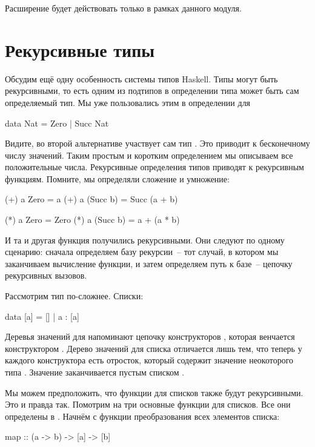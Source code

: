 Расширение будет действовать только в рамках данного модуля.


\section{Рекурсивные типы}

Обсудим ещё одну особенность системы типов Haskell. 
Типы могут быть рекурсивными,
то есть одним из подтипов в определении типа может быть
сам определяемый тип. Мы уже пользовались этим в определении
для 

\begin{code}
data Nat = Zero | Succ Nat
\end{code}

Видите, во второй альтернативе участвует сам тип .
Это приводит к бесконечному числу значений. Таким
простым и коротким определением мы описываем все
положительные числа. Рекурсивные определения типов приводят
к рекурсивным функциям. Помните, мы определяли сложение 
и умножение:

\begin{code}
(+) a Zero     = a
(+) a (Succ b) = Succ (a + b)

(*) a Zero     = Zero
(*) a (Succ b) = a + (a * b)   
\end{code}

И та и другая функция получились рекурсивными.
Они следуют по одному сценарию: сначала определяем базу
рекурсии~-- тот случай, в котором мы заканчиваем 
вычисление функции, и затем определяем путь к базе~--
цепочку рекурсивных вызовов. 

Рассмотрим тип по-сложнее. Списки:

\begin{code}
data [a] = [] | a : [a]
\end{code}

Деревья значений для  напоминают цепочку 
конструкторов , которая венчается конструктором
. Дерево значений для списка отличается лишь тем,
что теперь у каждого конструктора  есть отросток,
который содержит значение неокоторого типа . Значение 
заканчивается пустым списком \In{[]}.

Мы можем предположить, что функции для списков также будут
рекурсивными. Это и правда так. Помотрим на
три основные функции для списков. Все они определены в 
. Начнём с функции преобразования всех элементов списка:

\begin{code}
map :: (a -> b) -> [a] -> [b]
\end{code}

